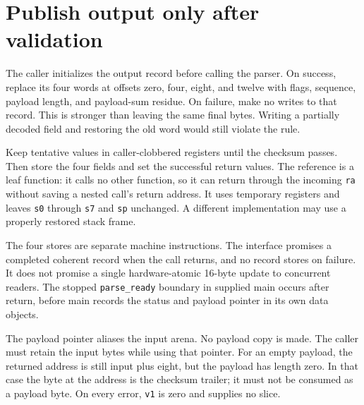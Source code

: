 \section{Publish output only after validation}
The caller initializes the output record before calling the parser. On success,
replace its four words at offsets zero, four, eight, and twelve with flags,
sequence, payload length, and payload-sum residue. On failure, make no writes to
that record. This is stronger than leaving the same final bytes. Writing a
partially decoded field and restoring the old word would still violate the rule.

Keep tentative values in caller-clobbered registers until the checksum passes.
Then store the four fields and set the successful return values. The reference
is a leaf function: it calls no other function, so it can return through the
incoming \texttt{ra} without saving a nested call's return address. It uses temporary
registers and leaves \texttt{s0} through \texttt{s7} and \texttt{sp} unchanged. A different
implementation may use a properly restored stack frame.

The four stores are separate machine instructions. The interface promises a
completed coherent record when the call returns, and no record stores on failure.
It does not promise a single hardware-atomic 16-byte update to concurrent readers.
The stopped \texttt{parse\_ready} boundary in supplied main occurs after return, before
main records the status and payload pointer in its own data objects.

The payload pointer aliases the input arena. No payload copy is made. The caller
must retain the input bytes while using that pointer. For an empty payload, the
returned address is still input plus eight, but the payload has length zero. In
that case the byte at the address is the checksum trailer; it must not be consumed
as a payload byte. On every error, \texttt{v1} is zero and supplies no slice.
